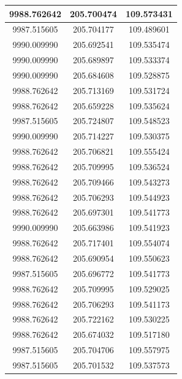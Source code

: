 \documentclass[a4paper,14pt]{article}
\begin{document}
\begin{longtable}[c]{|c|c|c|}
	9988.762642       & 205.700474           & 109.573431        \\ \hline
	9987.515605       & 205.704177           & 109.489601        \\ \hline
	9990.009990       & 205.692541           & 109.535474        \\ \hline
	9990.009990       & 205.689897           & 109.533374        \\ \hline
	9990.009990       & 205.684608           & 109.528875        \\ \hline
	9988.762642       & 205.713169           & 109.531724        \\ \hline
	9988.762642       & 205.659228           & 109.535624        \\ \hline
	9987.515605       & 205.724807           & 109.548523        \\ \hline
	9990.009990       & 205.714227           & 109.530375        \\ \hline
	9988.762642       & 205.706821           & 109.555424        \\ \hline
	9988.762642       & 205.709995           & 109.536524        \\ \hline
	9988.762642       & 205.709466           & 109.543273        \\ \hline
	9988.762642       & 205.706293           & 109.544923        \\ \hline
	9988.762642       & 205.697301           & 109.541773        \\ \hline
	9990.009990       & 205.663986           & 109.541923        \\ \hline
	9988.762642       & 205.717401           & 109.554074        \\ \hline
	9988.762642       & 205.690954           & 109.550623        \\ \hline
	9987.515605       & 205.696772           & 109.541773        \\ \hline
	9988.762642       & 205.709995           & 109.529025        \\ \hline
	9988.762642       & 205.706293           & 109.541173        \\ \hline
	9988.762642       & 205.722162           & 109.530225        \\ \hline
	9988.762642       & 205.674032           & 109.517180        \\ \hline
	9987.515605       & 205.704706           & 109.557975        \\ \hline
	9987.515605       & 205.701532           & 109.537573        \\ \hline

\end{longtable}
\end{document}
